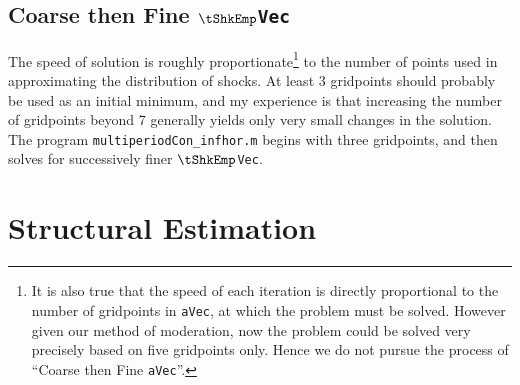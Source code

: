 \documentclass[titlepage]{\econtex}
\begin{document}

  \subsection{Coarse then Fine \texttt{$\tShkEmp$Vec}}

  The speed of solution is roughly proportionate\footnote{It is also
    true that the speed of each iteration is directly proportional to
    the number of gridpoints in \texttt{aVec}, at which the problem must
    be solved. However given our method of moderation, now the problem
    could be solved very precisely based on five gridpoints only. Hence
    we do not pursue the process of ``Coarse then Fine \texttt{aVec}''.}
  to the number of points used in approximating the distribution of
  shocks.  At least 3 gridpoints should probably be used as an initial
  minimum, and my experience is that increasing the number of gridpoints
  beyond 7 generally yields only very small changes in the solution.  The program
  \texttt{multiperiodCon\_infhor.m}
  begins with three gridpoints, and then solves for successively finer
  \texttt{$\tShkEmp$Vec}.

  \hypertarget{StructuralEstimation}{}
  \section{Structural Estimation}
\end{document}
